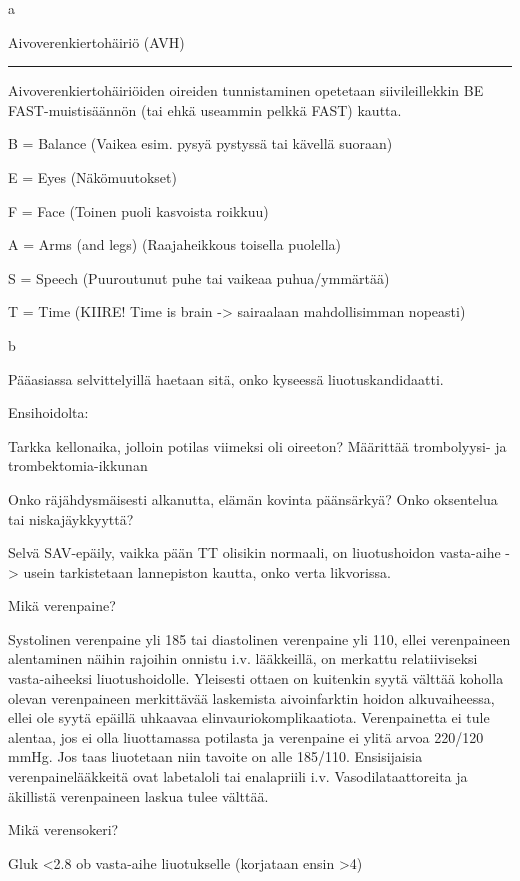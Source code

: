 \documentclass[
]{book}
\begin{document}
a

Aivoverenkiertohäiriö (AVH)

\begin{center}\rule{0.5\linewidth}{0.5pt}\end{center}

Aivoverenkiertohäiriöiden oireiden tunnistaminen opetetaan siivileillekkin BE FAST-muistisäännön (tai ehkä useammin pelkkä FAST) kautta.

B = Balance (Vaikea esim. pysyä pystyssä tai kävellä suoraan)

E = Eyes (Näkömuutokset)

F = Face (Toinen puoli kasvoista roikkuu)

A = Arms (and legs) (Raajaheikkous toisella puolella)

S = Speech (Puuroutunut puhe tai vaikeaa puhua/ymmärtää)

T = Time (KIIRE! Time is brain -\textgreater{} sairaalaan mahdollisimman nopeasti)

b

Pääasiassa selvittelyillä haetaan sitä, onko kyseessä liuotuskandidaatti.

Ensihoidolta:

Tarkka kellonaika, jolloin potilas viimeksi oli oireeton? Määrittää trombolyysi- ja trombektomia-ikkunan

Onko räjähdysmäisesti alkanutta, elämän kovinta päänsärkyä? Onko oksentelua tai niskajäykkyyttä?

Selvä SAV-epäily, vaikka pään TT olisikin normaali, on liuotushoidon vasta-aihe -\textgreater{} usein tarkistetaan lannepiston kautta, onko verta likvorissa.

Mikä verenpaine?

Systolinen verenpaine yli 185 tai diastolinen verenpaine yli 110, ellei verenpaineen alentaminen näihin rajoihin onnistu i.v. lääkkeillä, on merkattu relatiiviseksi vasta-aiheeksi liuotushoidolle. Yleisesti ottaen on kuitenkin syytä välttää koholla olevan verenpaineen merkittävää laskemista aivoinfarktin hoidon alkuvaiheessa, ellei ole syytä epäillä uhkaavaa elinvauriokomplikaatiota. Verenpainetta ei tule alentaa, jos ei olla liuottamassa potilasta ja verenpaine ei ylitä arvoa 220/120 mmHg. Jos taas liuotetaan niin tavoite on alle 185/110. Ensisijaisia verenpainelääkkeitä ovat labetaloli tai enalapriili i.v. Vasodilataattoreita ja äkillistä verenpaineen laskua tulee välttää.

Mikä verensokeri?

Gluk \textless2.8 ob vasta-aihe liuotukselle (korjataan ensin \textgreater4)
\end{document}
